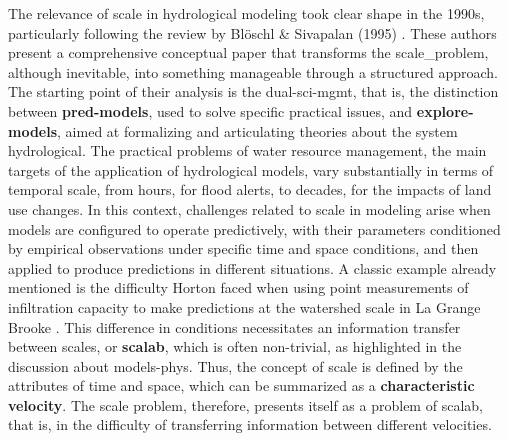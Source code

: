 \documentclass[./main_en.tex]{subfiles}
\begin{document}
\par The relevance of scale in hydrological modeling took clear shape in the 1990s, particularly following the review by Blöschl \& Sivapalan (1995) \cite{Bloschl1995a}. These authors present a comprehensive conceptual paper that transforms the \gls{scale_problem}, although inevitable, into something manageable through a structured approach. The starting point of their analysis is the \gls{dual-sci-mgmt}, that is, the distinction between \textbf{\gls{pred-models}}, used to solve specific practical issues, and \textbf{\gls{explore-models}}, aimed at formalizing and articulating theories about the \gls{system} hydrological. The practical problems of water resource management, the main targets of the application of hydrological models, vary substantially in terms of temporal scale, from hours, for flood alerts, to decades, for the impacts of land use changes. In this context, challenges related to scale in modeling arise when models are configured to operate predictively, with their \gls{parameters} conditioned by empirical observations under specific time and space conditions, and then applied to produce predictions in different situations. A classic example already mentioned is the difficulty Horton faced when using point measurements of infiltration capacity to make predictions at the watershed scale in La Grange Brooke \cite{Beven2004c}. This difference in conditions necessitates an information transfer between scales, or \textbf{\gls{scalab}}, which is often non-trivial, as highlighted in the discussion about \gls{models-phys}. Thus, the concept of scale is defined by the attributes of time and space, which can be summarized as a \textbf{characteristic velocity}. The scale problem, therefore, presents itself as a problem of \gls{scalab}, that is, in the difficulty of transferring information between different velocities.
\end{document}
